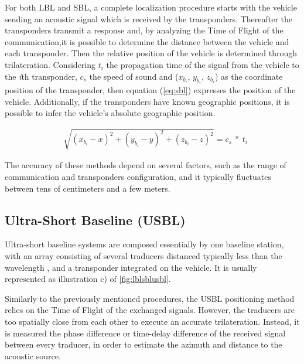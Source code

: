 For both LBL and SBL, a complete localization procedure starts with the vehicle sending an acoustic signal which is received by the transponders. Thereafter the transponders transmit a response and, by analyzing the Time of Flight of the communication,it is possible to determine the distance between the vehicle and each transponder. Then the relative position of the vehicle is determined through trilateration. Considering $t_{i}$ the propagation time of the signal from the vehicle to the \textit{i}th transponder, $c_s$ the speed of sound and ($x_{b_{i}}$, $y_{b_{i}}$, $z_{b_{i}}$) as the coordinate position of the transponder, then equation (\ref{eq:sbl}) \cite{sbl} expresses the position of the vehicle. Additionally, if the transponders have known geographic positions, it is possible to infer the vehicle's absolute geographic position. 

\begin{eqnarray}
	&\sqrt{ (x_{b_{i}}-x)^2 + (y_{b_{i}}-y)^2 + (z_{b_{i}}-z)^2 } = c_s\ *\ t_{i}
	\label{eq:sbl}
\end{eqnarray}


The accuracy of these methods depend on several factors, such as the range of communication and transponders configuration, and it typically fluctuates between tens of centimeters and a few meters.


\subsection{Ultra-Short Baseline (USBL)}

Ultra-short baseline systems are composed essentially by one baseline station, with an array consisting of several traducers distanced typically less than the wavelength \cite{lblsblusbl}, and a transponder integrated on the vehicle. It is usually represented as illustration c) of \ref{fig:lblsblusbl}.

Similarly to the previously mentioned procedures, the USBL positioning method relies on the Time of Flight of the exchanged signals. However, the traducers are too spatially close from each other to execute an accurate trilateration. Instead, it is measured the phase difference or time-delay difference of the received signal between every traducer, in order to estimate the azimuth and distance to the acoustic source. 

